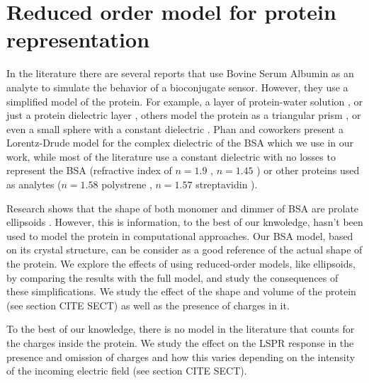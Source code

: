 
\chapter{Reduced order model for protein representation}

In the literature there are several reports that use Bovine Serum Albumin as an analyte
to simulate the behavior of a bioconjugate sensor. However, they use a simplified model
of the protein. For example, a layer of protein-water solution \cite{PhanETal2013}, 
or just a protein dielectric layer \cite{NghiemETal2012}, others model the
protein as a triangular prism \cite{DanHu2014}, or even a small sphere with a 
constant dielectric \cite{SantiagoCordobaETal2011, UngerETal2009}. Phan and 
coworkers \cite{PhanETal2013} present a Lorentz-Drude model for the complex 
dielectric of the BSA which we use in our work, while most of the literature 
use a constant dielectric with no losses to represent the BSA 
(refractive index of $n= 1.9$ \cite{NghiemETal2012}, $n= 1.45$ \cite{SantiagoCordobaETal2011}) or
other proteins used as analytes ($n=1.58$ polystrene \cite{UngerETal2009}, $n=1.57$ 
streptavidin \cite{ShenETal2013}). 

Research shows that the shape of both monomer and dimmer of 
BSA are prolate ellipsoids \cite{MoserETal1966, SquireETal1968, WrightETal1975}. However,
this is information, to the best of our knwoledge, hasn't been used to model the 
protein in computational approaches. Our BSA model, based on its crystal 
structure, can be consider as a good reference of the actual shape of the protein. We 
explore the effects of using reduced-order models, like ellipsoids, by comparing 
the results with the full model, and study the consequences of these 
simplifications. We study the effect of the shape and volume of the protein
(see section CITE SECT) as well as the presence of charges in it. 

To the best of our knowledge, there is no model in the literature that counts 
for the charges inside the protein. We study the effect on the LSPR response 
in the presence and omission of charges and how this varies depending on the 
intensity of the incoming electric field (see section CITE SECT).\\  